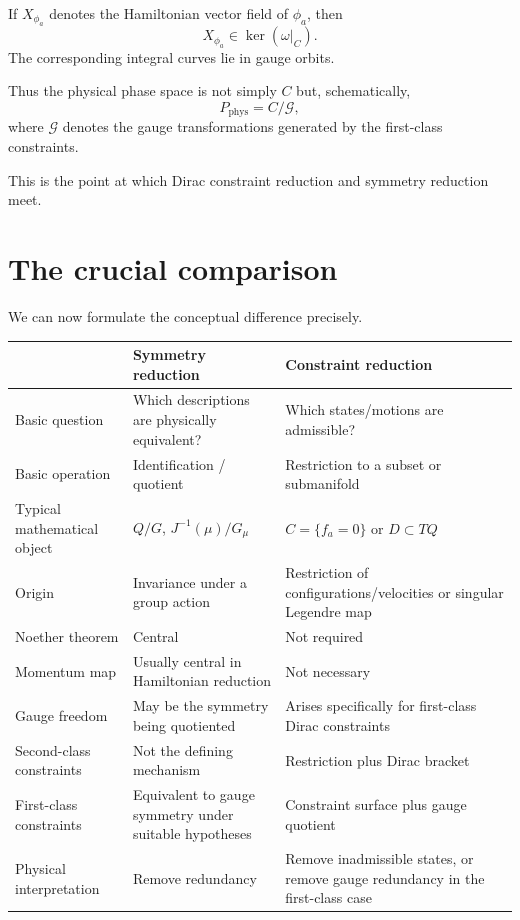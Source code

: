 If $X_{\phi_a}$ denotes the Hamiltonian vector field of $\phi_a$, then
\[
        X_{\phi_a}\in\ker(\omega|_C).
\]
The corresponding integral curves lie in gauge orbits.

Thus the physical phase space is not simply $C$ but, schematically,
\[
        P_{\mathrm{phys}}
        =
        C/\mathcal G,
\]
where $\mathcal G$ denotes the gauge transformations generated by the
first-class constraints.

This is the point at which Dirac constraint reduction and symmetry reduction
meet.

\section{The crucial comparison}

We can now formulate the conceptual difference precisely.

\begin{center}
\begin{tabular}{p{}p{}p{}}
\toprule
& \textbf{Symmetry reduction} & \textbf{Constraint reduction}\\
\midrule
Basic question &
Which descriptions are physically equivalent? &
Which states/motions are admissible?\\
\addlinespace
Basic operation &
Identification / quotient &
Restriction to a subset or submanifold\\
\addlinespace
Typical mathematical object &
$Q/G$, $J^{-1}(\mu)/G_\mu$ &
$C=\{f_a=0\}$ or $D\subset TQ$\\
\addlinespace
Origin &
Invariance under a group action &
Restriction of configurations/velocities or singular Legendre map\\
\addlinespace
Noether theorem &
Central &
Not required\\
\addlinespace
Momentum map &
Usually central in Hamiltonian reduction &
Not necessary\\
\addlinespace
Gauge freedom &
May be the symmetry being quotiented &
Arises specifically for first-class Dirac constraints\\
\addlinespace
Second-class constraints &
Not the defining mechanism &
Restriction plus Dirac bracket\\
\addlinespace
First-class constraints &
Equivalent to gauge symmetry under suitable hypotheses &
Constraint surface plus gauge quotient\\
\addlinespace
Physical interpretation &
Remove redundancy &
Remove inadmissible states, or remove gauge redundancy in the
first-class case\\
\bottomrule
\end{tabular}
\end{center}

